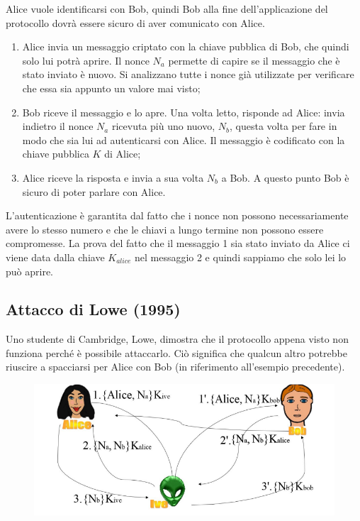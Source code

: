 Alice vuole identificarsi con Bob, quindi Bob alla fine dell'applicazione del protocollo dovrà essere
sicuro di aver comunicato con Alice.
\begin{enumerate}
    \item Alice invia un messaggio criptato con la
          chiave pubblica di Bob, che quindi solo lui potrà
          aprire. Il nonce \(N_a\) permette di capire se il
          messaggio che è stato inviato è nuovo. Si
          analizzano tutte i nonce già utilizzate per
          verificare che essa sia appunto un valore mai
          visto;
    \item Bob riceve il messaggio e lo apre. Una volta
          letto, risponde ad Alice: invia indietro il nonce
          \(N_a\) ricevuta più uno nuovo, \(N_b\), questa volta
          per fare in modo che sia lui ad autenticarsi con
          Alice. Il messaggio è codificato con la
          chiave pubblica \(K\) di Alice;
    \item Alice riceve la risposta e invia a sua volta
          \(N_b\) a Bob. A questo punto Bob è sicuro di poter
          parlare con Alice.
\end{enumerate}

L'autenticazione è garantita dal fatto che i nonce non
possono necessariamente avere lo stesso
numero e che le chiavi a lungo termine non possono
essere compromesse.
La prova del fatto che il messaggio 1 sia stato inviato
da Alice ci viene data dalla chiave \(K_{alice}\) nel
messaggio 2 e quindi sappiamo che solo lei lo può aprire.

\subsection{Attacco di Lowe (1995)}

Uno studente di Cambridge, Lowe, dimostra che il protocollo appena visto non
funziona perché è possibile attaccarlo. Ciò significa che qualcun altro potrebbe
riuscire a spacciarsi per Alice con Bob (in riferimento all'esempio precedente).

\begin{figure}[H]
    \centering
    \includegraphics[width=\textwidth, keepaspectratio]{capitoli/crittografia/imgs/alienospinning.png}
\end{figure}

